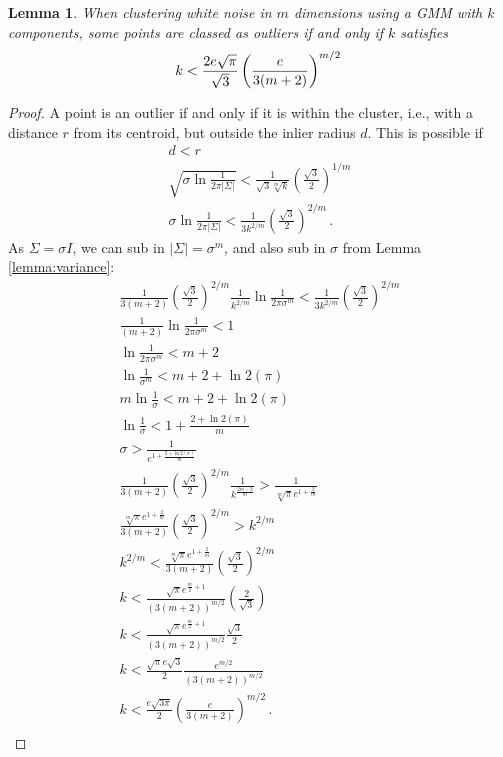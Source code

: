 \documentclass[a4paper,fleqn]{cas-sc}
\newtheorem{lemma}[theorem]{Lemma}
\theoremstyle{remark}
\begin{document}
\begin{lemma} \label{lemma:saturating-k}
When clustering white noise in $m$ dimensions using a GMM with $k$ components, some points are classed as outliers if and only if $k$ satisfies
\[
k < \frac{2e\sqrt{\pi}}{\sqrt{3}}\left(\frac{e}{3(m+2)}\right)^{m/2} \\
\]
\end{lemma} \label{lemma:k-at-which-contained}
\begin{proof}
A point is an outlier if and only if it is within the cluster, i.e., with a distance $r$ from its centroid, but outside the inlier radius $d$. This is possible if
\begin{gather*}
    d < r \\
    \sqrt{\sigma \ln{\frac{1}{2\pi |\Sigma|}}} <\frac{1}{\sqrt{3}\sqrt[m]{k}}\left(\frac{\sqrt{3}}{2}\right)^{1/m} \\
    \sigma \ln{\frac{1}{2\pi |\Sigma|}} < \frac{1}{3k^{2/m}}\left(\frac{\sqrt{3}}{2}\right)^{2/m} \,.
\end{gather*}
As $\Sigma = \sigma I$, we can sub in $|\Sigma| = \sigma^m$, and also sub in $\sigma$ from Lemma \ref{lemma:variance}:
\begin{gather*}
    \frac{1}{3(m+2)}\left(\frac{\sqrt{3}}{2}\right)^{2/m}\frac{1}{k^{2/m}}\ln{\frac{1}{2\pi \sigma^m}} < \frac{1}{3k^{2/m}}\left(\frac{\sqrt{3}}{2}\right)^{2/m} \\
    \frac{1}{(m+2)}\ln{\frac{1}{2\pi \sigma^m}} < 1 \\
    \ln{\frac{1}{2\pi \sigma^m}} < m+2 \\
    \ln{\frac{1}{\sigma^m}} < m+2 + \ln 2{(\pi)} \\
    m\ln{\frac{1}{\sigma}} < m+2 + \ln 2{(\pi)} \\
    \ln{\frac{1}{\sigma}} < 1 + \frac{2 + \ln 2{(\pi)}}{m}   \\
    \sigma > \frac{1}{e^{1 + \frac{2 + \ln 2{(\pi)}}{m}}}   \\
    \frac{1}{3(m+2)}\left(\frac{\sqrt{3}}{2}\right)^{2/m}\frac{1}{k^{\frac{2m-2}{m}}} > \frac{1}{\sqrt[m]{\pi}e^{1 + \frac{2}{m}}}   \\
    \frac{\sqrt[m]{\pi}e^{1 + \frac{2}{m}}}{3(m+2)}\left(\frac{\sqrt{3}}{2}\right)^{2/m} > k^{2/m} \\
    k^{2/m} < \frac{\sqrt[m]{\pi}e^{1 + \frac{2}{m}}}{3(m+2)}\left(\frac{\sqrt{3}}{2}\right)^{2/m} \\
    k < \frac{\sqrt{\pi}e^{\frac{m}{2} + 1}}{(3(m+2))^{m/2}}\left(\frac{2}{\sqrt{3}}\right) \\
    k < \frac{\sqrt{\pi}e^{\frac{m}{2} + 1}}{(3(m+2))^{m/2}}\frac{\sqrt{3}}{2} \\
    k < \frac{\sqrt{\pi}e\sqrt{3}}{2}\frac{e^{m/2}}{(3(m+2))^{m/2}} \\
    k < \frac{e\sqrt{3\pi}}{2}\left(\frac{e}{3(m+2)}\right)^{m/2} \,.\\
\end{gather*}
\end{proof}
\end{document}
